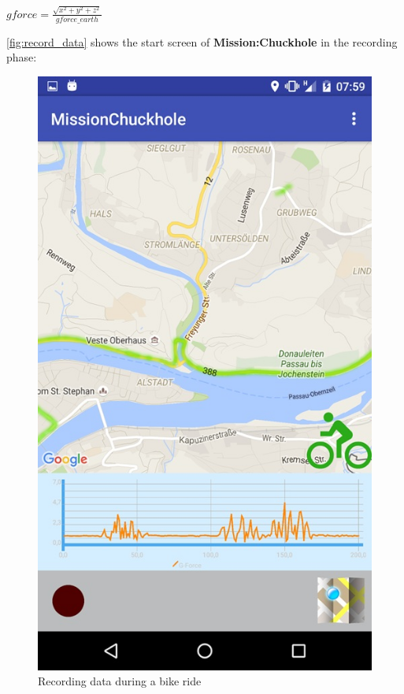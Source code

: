 \documentclass[10pt,a4paper]{article} %
\begin{document}
    
	\begin{center}
		$ gforce = \frac{\sqrt{x^2 + y^2 + z^2}}{gforce\_earth} $
	\end{center}
	
    	\autoref{fig:record_data} shows the start screen of \textbf{Mission:Chuckhole} in the recording phase:

	\begin{figure}[H]
	  \centering
    	  \includegraphics[scale=0.4]{pic2}
    	  \caption{Recording data during a bike ride }
	  \label{fig:record_data}
    \end{figure}
\end{document}
